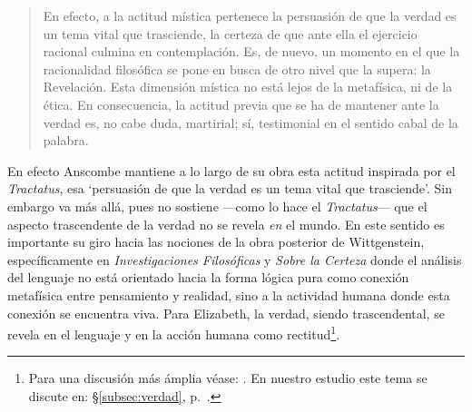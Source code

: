 \blockquote[{\Cite[357]{dominguez2009at}}]{En efecto, a la actitud mística pertenece la persuasión de que la verdad es un tema vital que trasciende, la certeza de que ante ella el ejercicio racional culmina en contemplación. Es, de nuevo, un momento en el que la racionalidad filosófica se pone en busca de otro nivel que la supera: la Revelación. Esta dimensión mística no está lejos de la metafísica, ni de la ética. \textelp{} En consecuencia, la actitud previa que se ha de mantener ante la verdad es, no cabe duda, martirial; sí, testimonial en el sentido cabal de la palabra.}

En efecto Anscombe mantiene a lo largo de su obra esta actitud inspirada por el \emph{Tractatus}, esa \enquote*{persuasión de que la verdad es un tema vital que trasciende}. Sin embargo va más allá, pues no sostiene ---como lo hace el \emph{Tractatus}--- que el aspecto trascendente de la verdad no se revela \emph{en} el mundo. En este sentido es importante su giro hacia las nociones de la obra posterior de Wittgenstein, específicamente en \emph{Investigaciones Filosóficas} y \emph{Sobre la Certeza} donde el análisis del lenguaje no está orientado hacia la forma lógica pura como conexión metafísica entre pensamiento y realidad, sino a la actividad humana donde esta conexión se encuentra viva. Para Elizabeth, la verdad, siendo trascendental, se revela en el lenguaje y en la acción humana como rectitud\footnote{Para una discusión más ámplia véase: \Cite{torralbaynubiola2005fayeh:unidadverdad}. En nuestro estudio este tema se discute en: \S\ref{subsec:verdad}, p.~\pageref{subsec:verdad}.}.

